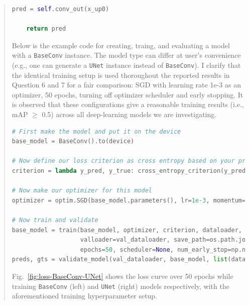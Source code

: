 \documentclass[9pt]{article}
\begin{document}
\begin{quote}
\begin{lstlisting}[language=Python, basicstyle=\scriptsize]
    pred = self.conv_out(x_up0)

    return pred
\end{lstlisting}


Below is the example code for creating, traing, and evaluating a model with a \texttt{BaseConv} instance. The model type can differ at user's convenience (e.g., one can generate a \texttt{UNet} instance instead of \texttt{BaseConv}). I clarify that the identical training setup is used thoroughout the reported results in Question 6 and 7 for a fair comparison: SGD with learning rate 1e-3 as an optimizer, 50 epochs, turning off optimizer scheduler and early stopping. It is observed that these configurations give a reasonable training results (i.e., mAP $\geq$ 0.5) across all deep-learning models we are investigating. 

\begin{lstlisting}[language=Python, basicstyle=\scriptsize]
# First make the model and put it on the device
base_model = BaseConv().to(device)

# Now define our loss criterion as cross entropy based on your previous code
criterion = lambda y_pred, y_true: cross_entropy_criterion(y_pred, y_true, class_weights, device)

# Now make our optimizer for this model
optimizer = optim.SGD(base_model.parameters(), lr=1e-3, momentum=0.9, weight_decay=0.01)

# Now train and validate
base_model = train(base_model, optimizer, criterion, dataloader, device, 
                   valloader=val_dataloader, save_path=os.path.join(MODEL_PATH, str(base_model)),
                   epochs=50, scheduler=None, num_early_stop=np.nan)
preds, gts = validate_model(val_dataloader, base_model, list(dataset.classes), device)
\end{lstlisting}

Fig.~\ref{fig:loss-BaseConv-UNet} shows the loss curve over 50 epochs while training \texttt{BaseConv} (left) and \texttt{UNet} (right) models respectively, with the aforementioned training hyperparameter setup. 


\end{quote}
\end{document}
